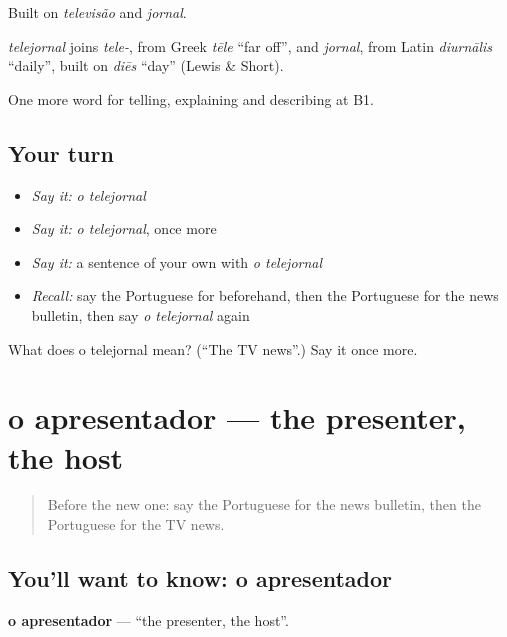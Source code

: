 Built on \emph{televisão} and \emph{jornal}.

\begin{cousinweb}
\emph{telejornal} joins \emph{tele-}, from Greek \emph{tēle} \textquotedblleft{}far off\textquotedblright{}, and \emph{jornal}, from Latin \emph{diurnālis} \textquotedblleft{}daily\textquotedblright{}, built on \emph{diēs} \textquotedblleft{}day\textquotedblright{} (Lewis \& Short).
\end{cousinweb}

\begin{grammarlens}[title={What you've built}]
One more word for telling, explaining and describing at B1.
\end{grammarlens}

\subsection*{Your turn}
\begin{itemize}
\raggedright
  \item \emph{Say it:} \emph{o telejornal}
  \item \emph{Say it:} \emph{o telejornal}, once more
  \item \emph{Say it:} a sentence of your own with \emph{o telejornal}
  \item \emph{Recall:} say the Portuguese for beforehand, then the Portuguese for the news bulletin, then say \emph{o telejornal} again
\end{itemize}

\begin{tcolorbox}[breakable,colback=teal!4,colframe=teal!35!black,title={Before you move on}]
What does o telejornal mean? (\textquotedblleft{}The TV news\textquotedblright{}.) Say it once more.
\end{tcolorbox}
\section[o apresentador]{o apresentador — the presenter, the host}

\label{lesson:PT-C278-apresentador}



\begin{quote}
Before the new one: say the Portuguese for the news bulletin, then the Portuguese for the TV news.
\end{quote}

\subsection*{You'll want to know: o apresentador}
\textbf{o apresentador} — \textquotedblleft{}the presenter, the host\textquotedblright{}.

